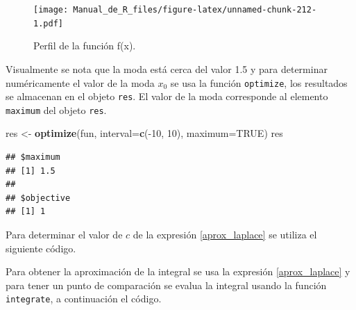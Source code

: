 \documentclass[10pt,]{krantz}
\makeatletter
\newenvironment{Shaded}{\begin{snugshade}}{\end{snugshade}}
\newcommand{\KeywordTok}[1]{\textcolor[rgb]{0.13,0.29,0.53}{\textbf{{#1}}}}
\newcommand{\DataTypeTok}[1]{\textcolor[rgb]{0.13,0.29,0.53}{{#1}}}
\newcommand{\DecValTok}[1]{\textcolor[rgb]{0.00,0.00,0.81}{{#1}}}
\newcommand{\StringTok}[1]{\textcolor[rgb]{0.31,0.60,0.02}{{#1}}}
\newcommand{\OtherTok}[1]{\textcolor[rgb]{0.56,0.35,0.01}{{#1}}}
\newcommand{\NormalTok}[1]{{#1}}
\newenvironment{kframe}{%
\medskip{}
\setlength{\fboxsep}{.8em}
 \def\at@end@of@kframe{}%
 \ifinner\ifhmode%
  \def\at@end@of@kframe{\end{minipage}}%
  \begin{minipage}{\columnwidth}%
 \fi\fi%
 \def\FrameCommand##1{\hskip\@totalleftmargin \hskip-\fboxsep
 \colorbox{shadecolor}{##1}\hskip-\fboxsep
     \hskip-\linewidth \hskip-\@totalleftmargin \hskip\columnwidth}%
 \MakeFramed {\advance\hsize-\width
   \@totalleftmargin\z@ \linewidth\hsize
   \@setminipage}}%
 {\par\unskip\endMakeFramed%
 \at@end@of@kframe}
\renewenvironment{Shaded}{\begin{kframe}}{\end{kframe}}
\makeatother
\begin{document}
\begin{figure}[htbp]
\centering
\texttt{[image: Manual\_de\_R\_files/figure-latex/unnamed-chunk-212-1.pdf]}
\caption{\label{fig:unnamed-chunk-212}Perfil de la función f(x).}
\end{figure}

Visualmente se nota que la moda está cerca del valor 1.5 y para
determinar numéricamente el valor de la moda \(x_0\) se usa la función
\texttt{optimize}, los resultados se almacenan en el objeto
\texttt{res}. El valor de la moda corresponde al elemento
\texttt{maximum} del objeto \texttt{res}.

\begin{Shaded}
\begin{Highlighting}[]
\NormalTok{res <-}\StringTok{ }\KeywordTok{optimize}\NormalTok{(fun, }\DataTypeTok{interval=}\KeywordTok{c}\NormalTok{(-}\DecValTok{10}\NormalTok{, }\DecValTok{10}\NormalTok{), }\DataTypeTok{maximum=}\OtherTok{TRUE}\NormalTok{)}
\NormalTok{res}
\end{Highlighting}
\end{Shaded}

\begin{verbatim}
## $maximum
## [1] 1.5
## 
## $objective
## [1] 1
\end{verbatim}

Para determinar el valor de \(c\) de la expresión \ref{aprox_laplace} se
utiliza el siguiente código.

\begin{Shaded}
\end{Shaded}

Para obtener la aproximación de la integral se usa la expresión
\ref{aprox_laplace} y para tener un punto de comparación se evalua la
integral usando la función \texttt{integrate}, a continuación el código.

\begin{Shaded}
\end{Shaded}
\end{document}
